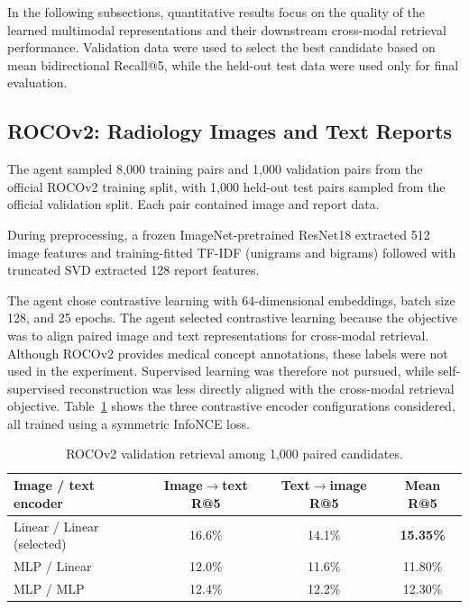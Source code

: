 \documentclass[10pt]{article}
\begin{document}
In the following subsections, quantitative results focus on the quality of the 
learned multimodal representations and their downstream cross-modal retrieval 
performance. Validation data were used to select the best candidate based on mean 
bidirectional Recall@5, while the held-out test data were used only for final evaluation.

\subsection{ROCOv2: Radiology Images and Text Reports}

The agent sampled 8,000 training pairs and 1,000 
validation pairs from the official ROCOv2 training split, with 1,000 held-out test pairs sampled from the official 
validation split. Each pair contained image and report data. 

During preprocessing, a frozen ImageNet-pretrained ResNet18 extracted 512 image features
and training-fitted TF-IDF (unigrams and bigrams) followed with truncated SVD extracted 128 report 
features. 

The agent chose contrastive learning with 64-dimensional embeddings, 
batch size 128, and 25 epochs. The agent selected contrastive learning because the objective was to align paired 
image and text representations for cross-modal retrieval. 
Although ROCOv2 provides medical concept annotations, these labels 
were not used in the experiment. Supervised learning was therefore not pursued,
while self-supervised reconstruction was less directly aligned with the cross-modal 
retrieval objective. Table~\ref{tab:roco} shows the three contrastive encoder 
configurations considered, all trained using a symmetric InfoNCE loss.


\begin{table}[H]
\centering\small\setlength{\tabcolsep}{7pt}
\begin{tabular}{lccc}
\toprule
\textbf{Image / text encoder} & \textbf{Image$\to$text R@5} & \textbf{Text$\to$image R@5} & \textbf{Mean R@5}\\\midrule
Linear / Linear (selected) & 16.6\% & 14.1\% & \textbf{15.35\%}\\
MLP / Linear & 12.0\% & 11.6\% & 11.80\%\\
MLP / MLP & 12.4\% & 12.2\% & 12.30\%\\\bottomrule
\end{tabular}
\caption{ROCOv2 validation retrieval among 1,000 paired candidates.}
\label{tab:roco}
\end{table}
\end{document}
